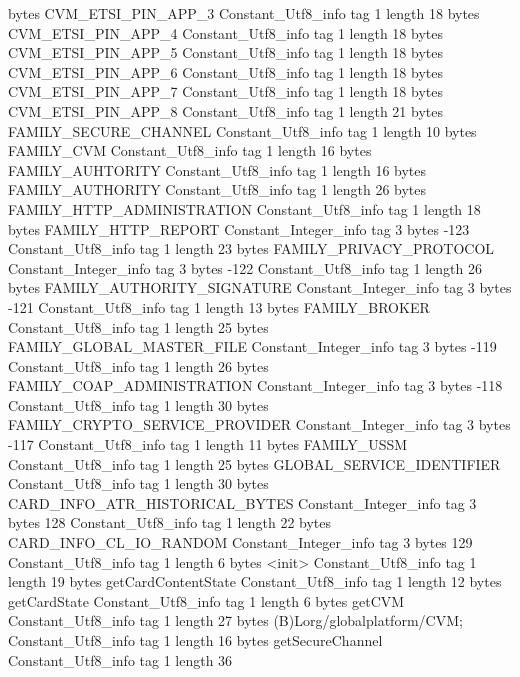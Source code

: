 {{{			bytes	CVM_ETSI_PIN_APP_3
		}
		Constant_Utf8_info {
			tag	1
			length	18
			bytes	CVM_ETSI_PIN_APP_4
		}
		Constant_Utf8_info {
			tag	1
			length	18
			bytes	CVM_ETSI_PIN_APP_5
		}
		Constant_Utf8_info {
			tag	1
			length	18
			bytes	CVM_ETSI_PIN_APP_6
		}
		Constant_Utf8_info {
			tag	1
			length	18
			bytes	CVM_ETSI_PIN_APP_7
		}
		Constant_Utf8_info {
			tag	1
			length	18
			bytes	CVM_ETSI_PIN_APP_8
		}
		Constant_Utf8_info {
			tag	1
			length	21
			bytes	FAMILY_SECURE_CHANNEL
		}
		Constant_Utf8_info {
			tag	1
			length	10
			bytes	FAMILY_CVM
		}
		Constant_Utf8_info {
			tag	1
			length	16
			bytes	FAMILY_AUHTORITY
		}
		Constant_Utf8_info {
			tag	1
			length	16
			bytes	FAMILY_AUTHORITY
		}
		Constant_Utf8_info {
			tag	1
			length	26
			bytes	FAMILY_HTTP_ADMINISTRATION
		}
		Constant_Utf8_info {
			tag	1
			length	18
			bytes	FAMILY_HTTP_REPORT
		}
		Constant_Integer_info {
			tag	3
			bytes	-123
		}
		Constant_Utf8_info {
			tag	1
			length	23
			bytes	FAMILY_PRIVACY_PROTOCOL
		}
		Constant_Integer_info {
			tag	3
			bytes	-122
		}
		Constant_Utf8_info {
			tag	1
			length	26
			bytes	FAMILY_AUTHORITY_SIGNATURE
		}
		Constant_Integer_info {
			tag	3
			bytes	-121
		}
		Constant_Utf8_info {
			tag	1
			length	13
			bytes	FAMILY_BROKER
		}
		Constant_Utf8_info {
			tag	1
			length	25
			bytes	FAMILY_GLOBAL_MASTER_FILE
		}
		Constant_Integer_info {
			tag	3
			bytes	-119
		}
		Constant_Utf8_info {
			tag	1
			length	26
			bytes	FAMILY_COAP_ADMINISTRATION
		}
		Constant_Integer_info {
			tag	3
			bytes	-118
		}
		Constant_Utf8_info {
			tag	1
			length	30
			bytes	FAMILY_CRYPTO_SERVICE_PROVIDER
		}
		Constant_Integer_info {
			tag	3
			bytes	-117
		}
		Constant_Utf8_info {
			tag	1
			length	11
			bytes	FAMILY_USSM
		}
		Constant_Utf8_info {
			tag	1
			length	25
			bytes	GLOBAL_SERVICE_IDENTIFIER
		}
		Constant_Utf8_info {
			tag	1
			length	30
			bytes	CARD_INFO_ATR_HISTORICAL_BYTES
		}
		Constant_Integer_info {
			tag	3
			bytes	128
		}
		Constant_Utf8_info {
			tag	1
			length	22
			bytes	CARD_INFO_CL_IO_RANDOM
		}
		Constant_Integer_info {
			tag	3
			bytes	129
		}
		Constant_Utf8_info {
			tag	1
			length	6
			bytes	<init>
		}
		Constant_Utf8_info {
			tag	1
			length	19
			bytes	getCardContentState
		}
		Constant_Utf8_info {
			tag	1
			length	12
			bytes	getCardState
		}
		Constant_Utf8_info {
			tag	1
			length	6
			bytes	getCVM
		}
		Constant_Utf8_info {
			tag	1
			length	27
			bytes	(B)Lorg/globalplatform/CVM;
		}
		Constant_Utf8_info {
			tag	1
			length	16
			bytes	getSecureChannel
		}
		Constant_Utf8_info {
			tag	1
			length	36
}}}
